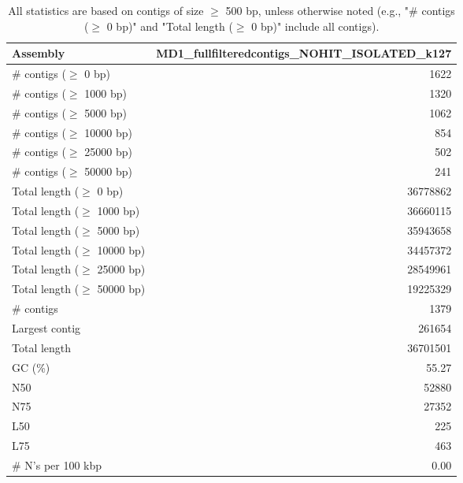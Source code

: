 \documentclass[12pt,a4paper]{article}
\begin{document}
\begin{table}[ht]
\begin{center}
\caption{All statistics are based on contigs of size $\geq$ 500 bp, unless otherwise noted (e.g., "\# contigs ($\geq$ 0 bp)" and "Total length ($\geq$ 0 bp)" include all contigs).}
\begin{tabular}{|l*{1}{|r}|}
\hline
Assembly & MD1\_fullfilteredcontigs\_NOHIT\_ISOLATED\_k127 \\ \hline
\# contigs ($\geq$ 0 bp) & 1622 \\ \hline
\# contigs ($\geq$ 1000 bp) & 1320 \\ \hline
\# contigs ($\geq$ 5000 bp) & 1062 \\ \hline
\# contigs ($\geq$ 10000 bp) & 854 \\ \hline
\# contigs ($\geq$ 25000 bp) & 502 \\ \hline
\# contigs ($\geq$ 50000 bp) & 241 \\ \hline
Total length ($\geq$ 0 bp) & 36778862 \\ \hline
Total length ($\geq$ 1000 bp) & 36660115 \\ \hline
Total length ($\geq$ 5000 bp) & 35943658 \\ \hline
Total length ($\geq$ 10000 bp) & 34457372 \\ \hline
Total length ($\geq$ 25000 bp) & 28549961 \\ \hline
Total length ($\geq$ 50000 bp) & 19225329 \\ \hline
\# contigs & 1379 \\ \hline
Largest contig & 261654 \\ \hline
Total length & 36701501 \\ \hline
GC (\%) & 55.27 \\ \hline
N50 & 52880 \\ \hline
N75 & 27352 \\ \hline
L50 & 225 \\ \hline
L75 & 463 \\ \hline
\# N's per 100 kbp & 0.00 \\ \hline
\end{tabular}
\end{center}
\end{table}
\end{document}

